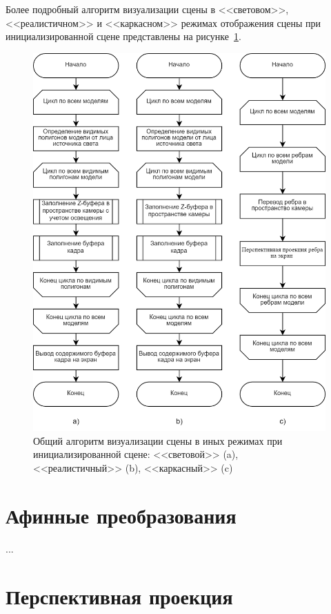 Более подробный алгоритм визуализации сцены в <<световом>>, <<реалистичном>> и <<каркасном>> режимах отображения сцены при инициализированной сцене представлены на рисунке~\ref{fig:other-mods}.
\begin{figure}[h] 
	\centering
	\includegraphics[width=1\textwidth]{images/other-mods.png}
	\caption{Общий алгоритм визуализации сцены в иных режимах при инициализированной сцене: <<световой>> (a), <<реалистичный>> (b), <<каркасный>> (c)} 
	\label{fig:other-mods} 
\end{figure}


\clearpage

\section{Афинные преобразования}

...

\section{Перспективная проекция}

